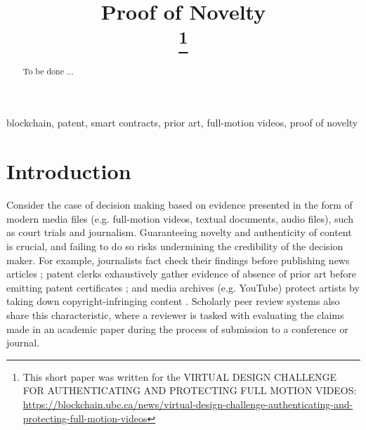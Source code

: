\documentclass[conference]{IEEEtran}
\begin{document}
\title{Proof of Novelty\\
\thanks{This short paper was written for the VIRTUAL DESIGN CHALLENGE FOR AUTHENTICATING AND PROTECTING FULL MOTION VIDEOS: \url{https://blockchain.ubc.ca/news/virtual-design-challenge-authenticating-and-protecting-full-motion-videos}}
}

\author{
}

\maketitle

\begin{abstract}
To be done ...
\end{abstract}

\begin{IEEEkeywords}
blockchain, patent, smart contracts, prior art, full-motion videos, proof of novelty
\end{IEEEkeywords}

\section{Introduction}

Consider the case of decision making based on evidence presented in the form of modern media files (e.g. full-motion videos, textual documents, audio files), such as court trials and journalism. Guaranteeing novelty and authenticity of content  is crucial, and failing to do so risks undermining the credibility of the decision maker. For example, journalists fact check their findings before publishing news articles \cite{graves2016deciding}; patent clerks exhaustively gather evidence of absence of prior art before emitting patent certificates \cite{callaert2006traces}; and media archives (e.g. YouTube) protect artists by taking down copyright-infringing content \cite{o2006digital}. Scholarly peer review systems also share this characteristic, where a reviewer is tasked with evaluating the claims made in an academic paper during the process of submission to a conference or journal.
\end{document}
